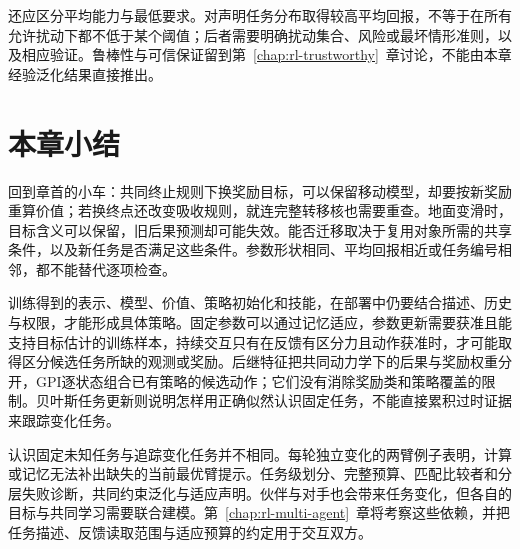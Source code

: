 还应区分平均能力与最低要求。对声明任务分布取得较高平均回报，不等于在所有允许扰动下都不低于某个阈值；后者需要明确扰动集合、风险或最坏情形准则，以及相应验证。鲁棒性与可信保证留到第~\ref{chap:rl-trustworthy}~章讨论，不能由本章经验泛化结果直接推出。

\section{本章小结}
\label{sec:rl-transfer-summary}

回到章首的小车：共同终止规则下换奖励目标，可以保留移动模型，却要按新奖励重算价值；若换终点还改变吸收规则，就连完整转移核也需要重查。地面变滑时，目标含义可以保留，旧后果预测却可能失效。能否迁移取决于复用对象所需的共享条件，以及新任务是否满足这些条件。参数形状相同、平均回报相近或任务编号相邻，都不能替代逐项检查。

训练得到的表示、模型、价值、策略初始化和技能，在部署中仍要结合描述、历史与权限，才能形成具体策略。固定参数可以通过记忆适应，参数更新需要获准且能支持目标估计的训练样本，持续交互只有在反馈有区分力且动作获准时，才可能取得区分候选任务所缺的观测或奖励。后继特征把共同动力学下的后果与奖励权重分开，GPI逐状态组合已有策略的候选动作；它们没有消除奖励类和策略覆盖的限制。贝叶斯任务更新则说明怎样用正确似然认识固定任务，不能直接累积过时证据来跟踪变化任务。

认识固定未知任务与追踪变化任务并不相同。每轮独立变化的两臂例子表明，计算或记忆无法补出缺失的当前最优臂提示。任务级划分、完整预算、匹配比较者和分层失败诊断，共同约束泛化与适应声明。伙伴与对手也会带来任务变化，但各自的目标与共同学习需要联合建模。第~\ref{chap:rl-multi-agent}~章将考察这些依赖，并把任务描述、反馈读取范围与适应预算的约定用于交互双方。
